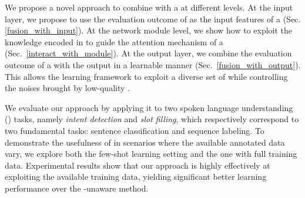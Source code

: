 


We propose a novel approach to combine \REs with a \NN at different levels. At the input layer, we propose to use the evaluation outcome of
\REs as the input features of a \NN (Sec.\ref{fusion_with_input}).
At the network module level, we show how to
exploit the knowledge encoded in \REs to guide the attention mechanism of a \NN (Sec.~\ref{interact_with_module}). At the output layer, we
combine the evaluation outcome of a \RE with the \NN output in a learnable manner (Sec.~\ref{fusion_with_output}). This allows the learning
framework to exploit a diverse set of \REs while controlling the noises brought by low-quality \REs.

%
We evaluate our approach by applying it to two spoken language understanding (\SLU) tasks, namely \emph{intent detection} and \emph{slot
filling}, which respectively correspond to two fundamental \NLP tasks: sentence classification and sequence labeling. To demonstrate the
usefulness of \REs in scenarios where the available annotated data vary, we explore both the few-shot learning setting and the one with
full training data. Experimental results show that our approach is highly effectively at exploiting the available training data, yielding
significant better learning performance over the \RE-unaware method.


